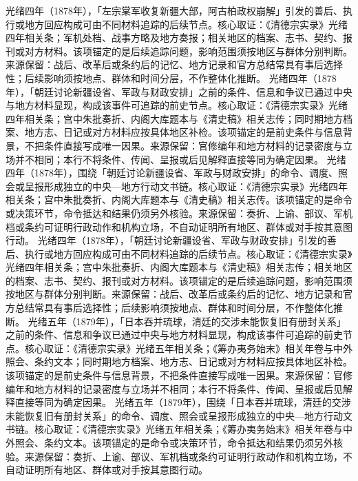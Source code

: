 光绪四年（1878年），「左宗棠军收复新疆大部，阿古柏政权崩解」引发的善后、执行或地方回应构成可由不同材料追踪的后续节点。核心取证：《清德宗实录》光绪四年相关条；军机处档、战事方略及地方奏报；相关地区的档案、志书、契约、报刊或对方材料。该项锚定的是后续追踪问题，影响范围须按地区与群体分别判断。来源保留：战后、改革后或条约后的记忆、地方记录和官方总结常具有事后选择性；后续影响须按地点、群体和时间分层，不作整体化推断。
光绪四年（1878年），「朝廷讨论新疆设省、军政与财政安排」之前的条件、信息和争议已通过中央与地方材料显现，构成该事件可追踪的前史节点。核心取证：《清德宗实录》光绪四年相关条；宫中朱批奏折、内阁大库题本与《清史稿》相关志传；同时期地方档案、地方志、日记或对方材料应按具体地区补检。该项锚定的是前史条件与信息背景，不把条件直接写成唯一因果。来源保留：官修编年和地方材料的记录密度与立场并不相同；本行不将条件、传闻、呈报或后见解释直接等同为确定因果。
光绪四年（1878年），围绕「朝廷讨论新疆设省、军政与财政安排」的命令、调度、照会或呈报形成独立的中央—地方行动文书链。核心取证：《清德宗实录》光绪四年相关条；宫中朱批奏折、内阁大库题本与《清史稿》相关志传。该项锚定的是命令或决策环节，命令抵达和结果仍须另外核验。来源保留：奏折、上谕、部议、军机档或条约可证明行政动作和机构立场，不自动证明所有地区、群体或对手按其意图行动。
光绪四年（1878年），「朝廷讨论新疆设省、军政与财政安排」引发的善后、执行或地方回应构成可由不同材料追踪的后续节点。核心取证：《清德宗实录》光绪四年相关条；宫中朱批奏折、内阁大库题本与《清史稿》相关志传；相关地区的档案、志书、契约、报刊或对方材料。该项锚定的是后续追踪问题，影响范围须按地区与群体分别判断。来源保留：战后、改革后或条约后的记忆、地方记录和官方总结常具有事后选择性；后续影响须按地点、群体和时间分层，不作整体化推断。
光绪五年（1879年），「日本吞并琉球，清廷的交涉未能恢复旧有册封关系」之前的条件、信息和争议已通过中央与地方材料显现，构成该事件可追踪的前史节点。核心取证：《清德宗实录》光绪五年相关条；《筹办夷务始末》相关年卷与中外照会、条约文本；同时期地方档案、地方志、日记或对方材料应按具体地区补检。该项锚定的是前史条件与信息背景，不把条件直接写成唯一因果。来源保留：官修编年和地方材料的记录密度与立场并不相同；本行不将条件、传闻、呈报或后见解释直接等同为确定因果。
光绪五年（1879年），围绕「日本吞并琉球，清廷的交涉未能恢复旧有册封关系」的命令、调度、照会或呈报形成独立的中央—地方行动文书链。核心取证：《清德宗实录》光绪五年相关条；《筹办夷务始末》相关年卷与中外照会、条约文本。该项锚定的是命令或决策环节，命令抵达和结果仍须另外核验。来源保留：奏折、上谕、部议、军机档或条约可证明行政动作和机构立场，不自动证明所有地区、群体或对手按其意图行动。
